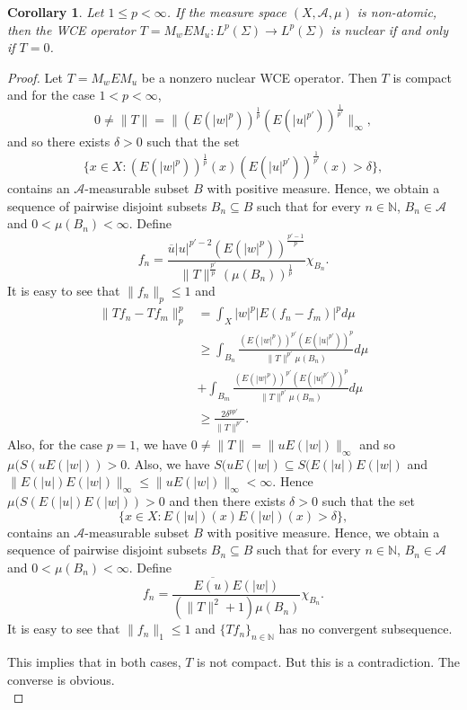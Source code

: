 \documentclass{amsart}
\newtheorem{cor}[thm]{Corollary}
\theoremstyle{definition}\newtheorem{defn}[thm]{Definition}
\theoremstyle{remark}
\numberwithin{equation}{section}
\newcommand{\A}{\mathcal{A}}
\begin{document}
\begin{cor}\label{c2.2} Let $1\leq p<\infty$. If the
measure space $(X,\mathcal{A},\mu)$ is non-atomic, then the WCE operator $T=M_wEM_u:L^{p}(\Sigma)\rightarrow L^{p}(\Sigma)$ is
nuclear if and only if  $T=0$.
\end{cor}
\begin{proof} Let $T=M_wEM_u$ be a nonzero
nuclear WCE operator. Then $T$ is compact and for the case $1<p<\infty$,
$$0\neq\|T\|=\|(E(|w|^{p}))^{\frac{1}{p}}(E(|u|^{p'}))^{\frac{1}{p'}}\|_{\infty},$$
and so there exists $\delta>0$ such that the set
$$\{x\in
X:(E(|w|^{p}))^{\frac{1}{p}}(x)(E(|u|^{p'}))^{\frac{1}{p'}}(x)>\delta\},$$
contains an $\mathcal{A}$-measurable subset $B$ with positive
measure. Hence, we obtain a sequence of pairwise disjoint subsets
$B_{n}\subseteq B$ such that for every $n\in\mathbb{N}$,
$B_{n}\in\A$ and $0<\mu(B_{n})<\infty$. Define
$$f_{n}=\frac{\overline{u}|u|^{p'-2}(E(|w|^{p}))^{\frac{p'-1}{p}}}
{\|T\|^{\frac{p'}{p}} (\mu(B_{n}))^{\frac{1}{p}}}\chi_{B_{n}}.$$
It is easy to see that $\|f_{n}\|_{p}\leq1$ and
\begin{align*}
\|Tf_{n}-Tf_{m}\|^{p}_{p}&=\int_{X}|w|^{p}|E(f_{n}-f_{m})|^{p}d\mu\\
&\geq\int_{B_{n}}\frac{(E(|w|^{p}))^{p'}(E(|u|^{p'}))^{p}}{\|T\|^{p'}\mu(B_{n})}d\mu\\
&+ \int_{B_{m}}\frac{(E(|w|^{p}))^{p'}(E(|u|^{p'}))^{p}}{\|T\|^{p'}\mu(B_{m})}d\mu\\
 &\geq \frac{2\delta^{pp'}} {\|T\|^{p'}}.
 \end{align*}
 Also, for the case $p=1$, we have
 $0\neq\|T\|=\|uE(|w|)\|_{\infty}$ and so $\mu(S(uE(|w|))>0$. Also, we have $S(uE(|w|)\subseteq S(E(|u|)E(|w|)$ and $\|E(|u|)E(|w|)\|_{\infty}\leq \|uE(|w|)\|_{\infty}<\infty$. Hence $\mu(S(E(|u|)E(|w|))>0$ and then there exists $\delta>0$ such that the set
$$\{x\in
X:E(|u|)(x)E(|w|)(x)>\delta\},$$
contains an $\mathcal{A}$-measurable subset $B$ with positive
measure. Hence, we obtain a sequence of pairwise disjoint subsets
$B_{n}\subseteq B$ such that for every $n\in\mathbb{N}$,
$B_{n}\in\A$ and $0<\mu(B_{n})<\infty$. Define
$$f_{n}=\frac{\overline{E(u)}E(|w|)}
{(\|T\|^2+1)\mu(B_{n})}\chi_{B_{n}}.$$
It is easy to see that $\|f_{n}\|_{1}\leq1$ and $\{Tf_n\}_{n\in \mathbb{N}}$ has no convergent subsequence.

  This implies that in both cases, $T$ is not compact. But this is a contradiction. The converse is obvious.\\
\end{proof}
\end{document}
